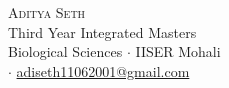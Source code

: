 \newcommand{\sep}{$\cdot$}%
\newcommand{\gmail}{adiseth11062001@gmail.com}
\newcommand{\iiserm}{ms19028@iisermohali.ac.in}

\begin{center}

\textsc{\huge Aditya Seth}\\[2mm]
Third Year Integrated Masters\\[1mm]
Biological Sciences \sep{} IISER Mohali\\[1mm]
\faEnvelope{} \href{mailto:\ethzmail}{\ethzmail} \sep{}
\faEnvelope{} \href{mailto:\gmail}{\gmail}

\end{center}

